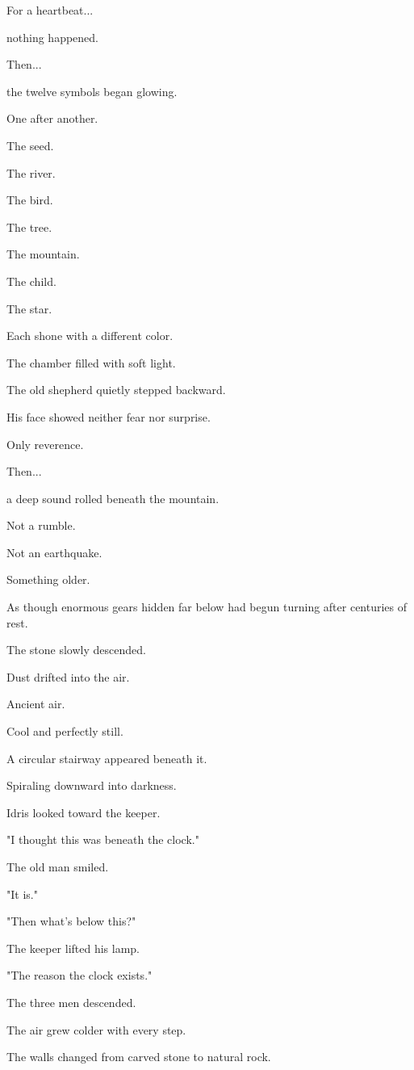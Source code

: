 \documentclass[12pt,openany]{book}
\begin{document}
For a heartbeat...

nothing happened.

Then...

the twelve symbols began glowing.

One after another.

The seed.

The river.

The bird.

The tree.

The mountain.

The child.

The star.

Each shone with a different color.

The chamber filled with soft light.

The old shepherd quietly stepped backward.

His face showed neither fear nor surprise.

Only reverence.

Then...

a deep sound rolled beneath the mountain.

Not a rumble.

Not an earthquake.

Something older.

As though enormous gears hidden far below had begun turning after centuries of rest.

The stone slowly descended.

Dust drifted into the air.

Ancient air.

Cool and perfectly still.

A circular stairway appeared beneath it.

Spiraling downward into darkness.

Idris looked toward the keeper.

"I thought this was beneath the clock."

The old man smiled.

"It is."

"Then what's below this?"

The keeper lifted his lamp.

"The reason the clock exists."

The three men descended.

The air grew colder with every step.

The walls changed from carved stone to natural rock.
\end{document}
